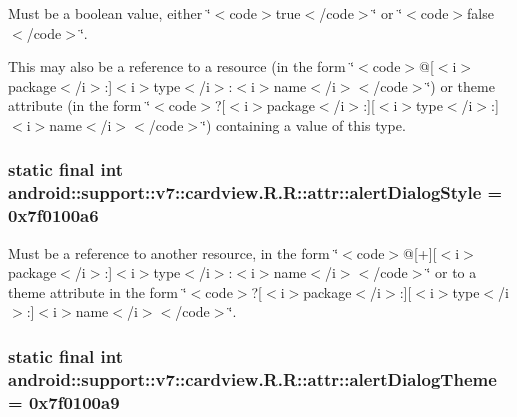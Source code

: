 Must be a boolean value, either \char`\"{}$<$code$>$true$<$/code$>$\char`\"{} or \char`\"{}$<$code$>$false$<$/code$>$\char`\"{}. 

This may also be a reference to a resource (in the form \char`\"{}$<$code$>$@\mbox{[}$<$i$>$package$<$/i$>$:\mbox{]}$<$i$>$type$<$/i$>$:$<$i$>$name$<$/i$>$$<$/code$>$\char`\"{}) or theme attribute (in the form \char`\"{}$<$code$>$?\mbox{[}$<$i$>$package$<$/i$>$:\mbox{]}\mbox{[}$<$i$>$type$<$/i$>$:\mbox{]}$<$i$>$name$<$/i$>$$<$/code$>$\char`\"{}) containing a value of this type. \hypertarget{classandroid_1_1support_1_1v7_1_1cardview_1_1_r_1_1attr_f36c73299d93b8eee8756a7f2b95faab}{
\subsubsection[{alertDialogStyle}]{\setlength{\rightskip}{0pt plus 5cm}static final int android::support::v7::cardview.R.R::attr::alertDialogStyle = 0x7f0100a6}}
\label{classandroid_1_1support_1_1v7_1_1cardview_1_1_r_1_1attr_f36c73299d93b8eee8756a7f2b95faab}


Must be a reference to another resource, in the form \char`\"{}$<$code$>$@\mbox{[}+\mbox{]}\mbox{[}$<$i$>$package$<$/i$>$:\mbox{]}$<$i$>$type$<$/i$>$:$<$i$>$name$<$/i$>$$<$/code$>$\char`\"{} or to a theme attribute in the form \char`\"{}$<$code$>$?\mbox{[}$<$i$>$package$<$/i$>$:\mbox{]}\mbox{[}$<$i$>$type$<$/i$>$:\mbox{]}$<$i$>$name$<$/i$>$$<$/code$>$\char`\"{}. \hypertarget{classandroid_1_1support_1_1v7_1_1cardview_1_1_r_1_1attr_75e83f834687803fd9ccffd45c471d79}{
\subsubsection[{alertDialogTheme}]{\setlength{\rightskip}{0pt plus 5cm}static final int android::support::v7::cardview.R.R::attr::alertDialogTheme = 0x7f0100a9}}
\label{classandroid_1_1support_1_1v7_1_1cardview_1_1_r_1_1attr_75e83f834687803fd9ccffd45c471d79}


